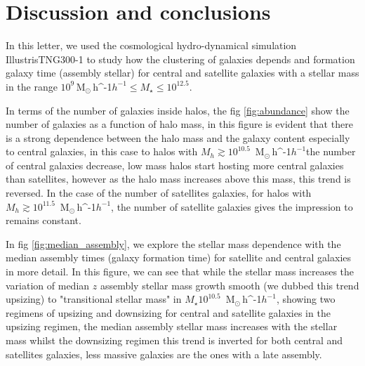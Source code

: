 \documentclass[a4paper,fleqn,usenatbib]{mnras}
\newcommand{\Msunh}{\,{\rm M}$_{\odot}$\,\ifmmode h^{-1}\else $h^{-1}$\fi}
\begin{document}
\section{Discussion and conclusions}
\label{sec:conclu}
In this letter, we used the cosmological hydro-dynamical simulation IllustrisTNG300-1 to study how the clustering of galaxies depends and formation galaxy time (assembly stellar) for central and satellite galaxies with a stellar mass in the range $10^{9}$\Msunh $\leq M_{\star} \leq 10^{12.5}$.


In terms of the number of galaxies inside halos, the fig \ref{fig:abundance} show the number of galaxies as a function of halo mass, in this figure is evident that there is a strong dependence between the halo mass and the galaxy content especially to central galaxies, in this case to halos with $M_h \gtrsim 10^{10.5}$ \Msunh the number of central galaxies decrease, low mass halos start hosting more central galaxies than satellites, however as the halo mass increases above this mass, this trend is reversed. In the case of the number of satellites galaxies, for halos with $M_h\gtrsim 10^{11.5}$ \Msunh, the number of satellite galaxies gives the impression to remains constant. %


In fig \ref{fig:median_assembly}, we explore the stellar mass dependence with the median assembly times (galaxy formation time) for satellite and central galaxies in more detail. In this figure, we can see that while the stellar mass increases the variation of median $z$ assembly stellar mass growth smooth (we dubbed this trend upsizing) to "transitional stellar mass" in $M_\star 10^{10.5}$ \Msunh, showing two regimens of upsizing and downsizing for central and satellite galaxies in the upsizing regimen, the median assembly stellar mass increases with the stellar mass whilst the downsizing regimen this trend is inverted for both central and satellites galaxies, less massive galaxies are the ones with a late assembly. %
\end{document}
